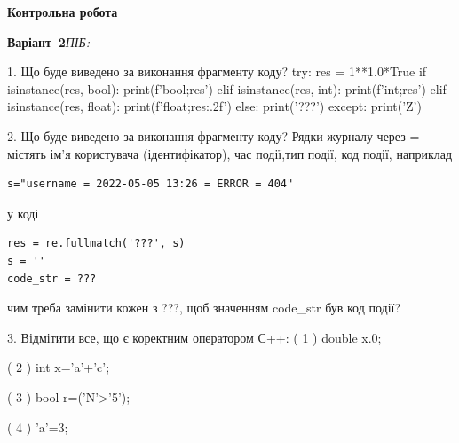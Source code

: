 \documentclass[11pt]{article}
\begin{document}
{\large\textbf{Контрольна робота}}

\textbf{Варіант \No\,2}\hfill \textit{ПІБ:}\,\underline{\hspace{60mm}}
\vspace{4mm}

1. Що буде виведено за виконання фрагменту коду?
try:
    res = 1**1.0*True
    if isinstance(res, bool):
        print(f'bool;{res}')
    elif isinstance(res, int):
        print(f'int;{res}')
    elif isinstance(res, float):
        print(f'float;{res:.2f}')
    else:
        print('???')
except:
    print('Z')


2. Що буде виведено за виконання фрагменту коду?
Рядки журналу через = містять ім'я користувача (ідентифікатор), час події,тип події, код події, наприклад
\begin{verbatim}
s="username = 2022-05-05 13:26 = ERROR = 404"
\end{verbatim}
у коді 
\begin{verbatim}
res = re.fullmatch('???', s) 
s = ''
code_str = ??? 
\end{verbatim}
чим треба замінити кожен з ???, щоб значенням code\_str був код події? 




3. Відмітити все, що є коректним оператором С++:
( 1 ) double x.0;

( 2 ) int x='a'+'c';

( 3 ) bool r=('N'>'5');

( 4 ) 'a'=3;


\newpage
\end{document}
